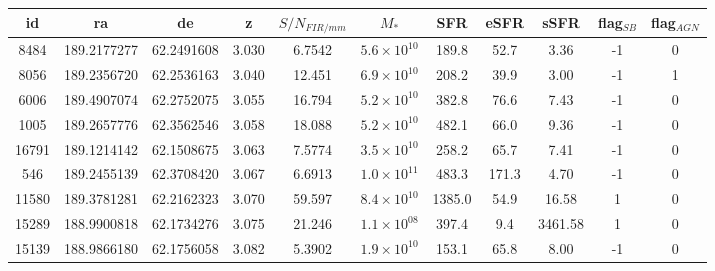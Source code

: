 
\begin{table}
  \centering
  \small
  \begin{tabular}{ccccccccccc}
  \hline
  \hline
         id &                           ra &                         de &              z &   $S/N_{FIR/mm}$ &            $M_{*}$ &            SFR &        eSFR &        sSFR &      flag$_{SB}$ &       flag$_{AGN}$ \\
  \hline
       8484 &                  189.2177277 &                 62.2491608 &          3.030 &           6.7542 & $5.6\times10^{10}$ &          189.8 &        52.7 &        3.36 &               -1 &                  0 \\
       8056 &                  189.2356720 &                 62.2536163 &          3.040 &           12.451 & $6.9\times10^{10}$ &          208.2 &        39.9 &        3.00 &               -1 &                  1 \\
       6006 &                  189.4907074 &                 62.2752075 &          3.055 &           16.794 & $5.2\times10^{10}$ &          382.8 &        76.6 &        7.43 &               -1 &                  0 \\
       1005 &                  189.2657776 &                 62.3562546 &          3.058 &           18.088 & $5.2\times10^{10}$ &          482.1 &        66.0 &        9.36 &               -1 &                  0 \\
      16791 &                  189.1214142 &                 62.1508675 &          3.063 &           7.5774 & $3.5\times10^{10}$ &          258.2 &        65.7 &        7.41 &               -1 &                  0 \\
        546 &                  189.2455139 &                 62.3708420 &          3.067 &           6.6913 & $1.0\times10^{11}$ &          483.3 &       171.3 &        4.70 &               -1 &                  0 \\
      11580 &                  189.3781281 &                 62.2162323 &          3.070 &           59.597 & $8.4\times10^{10}$ &         1385.0 &        54.9 &       16.58 &                1 &                  0 \\
      15289 &                  188.9900818 &                 62.1734276 &          3.075 &           21.246 & $1.1\times10^{08}$ &          397.4 &         9.4 &     3461.58 &                1 &                  0 \\
      15139 &                  188.9866180 &                 62.1756058 &          3.082 &           5.3902 & $1.9\times10^{10}$ &          153.1 &        65.8 &        8.00 &               -1 &                  0 \\

\end{tabular}
\end{table}
